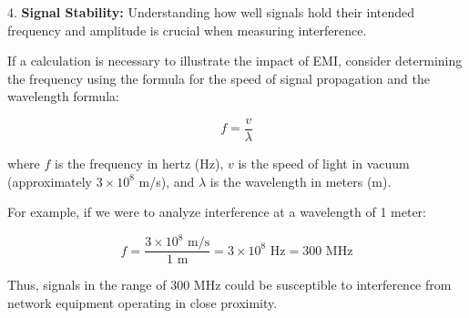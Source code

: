 4. \textbf{Signal Stability:} Understanding how well signals hold their intended frequency and amplitude is crucial when measuring interference.

If a calculation is necessary to illustrate the impact of EMI, consider determining the frequency using the formula for the speed of signal propagation and the wavelength formula:

\[
f = \frac{v}{\lambda}
\]

where \( f \) is the frequency in hertz (Hz), \( v \) is the speed of light in vacuum (approximately \( 3 \times 10^8 \) m/s), and \( \lambda \) is the wavelength in meters (m). 

For example, if we were to analyze interference at a wavelength of 1 meter:

\[
f = \frac{3 \times 10^8 \text{ m/s}}{1 \text{ m}} = 3 \times 10^8 \text{ Hz} = 300 \text{ MHz}
\]

Thus, signals in the range of 300 MHz could be susceptible to interference from network equipment operating in close proximity.



